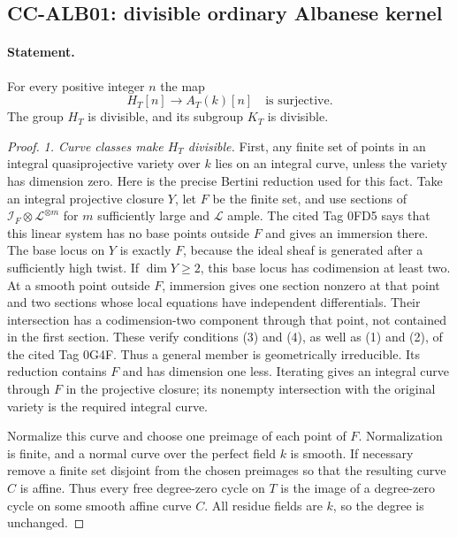 \documentclass[11pt,a4paper]{article}
\theoremstyle{definition}\newtheorem{definition}[theorem]{Definition}
\theoremstyle{remark}\newtheorem{remark}[theorem]{Remark}
\begin{document}
\subsection{CC-ALB01: divisible ordinary Albanese kernel}

\paragraph{Statement.}
For every positive integer $n$ the map
\[
 H_T[n]\longrightarrow A_T(k)[n]
 \quad\text{is surjective}.                         \tag{CC.ALB.1}
\]
The group $H_T$ is divisible, and its subgroup $K_T$ is
divisible.

\begin{proof}
\emph{1. Curve classes make $H_T$ divisible.}
First, any finite set of points in an integral
quasiprojective variety over $k$ lies on an integral
curve, unless the variety has dimension zero.
Here is the precise Bertini reduction used for this fact.
Take an integral projective closure $Y$, let $F$ be the
finite set, and use sections of
$\mathcal I_F\otimes\mathcal L^{\otimes m}$ for $m$
sufficiently large and $\mathcal L$ ample.
The cited Tag 0FD5 says that this linear system has no
base points outside $F$ and gives an immersion there.
The base locus on $Y$ is exactly $F$, because the ideal
sheaf is generated after a sufficiently high twist.
If $\dim Y\geq2$, this base locus has codimension at least
two.  At a smooth point outside $F$, immersion gives one
section nonzero at that point and two sections whose
local equations have independent differentials.
Their intersection has a codimension-two component
through that point, not contained in the first section.
These verify conditions (3) and (4), as well as (1) and
(2), of the cited Tag 0G4F.  Thus a general member is
geometrically irreducible.  Its reduction contains $F$
and has dimension one less.  Iterating gives an
integral curve through $F$ in the projective closure;
its nonempty intersection with the original variety
is the required integral curve.

Normalize this curve and choose one preimage of each
point of $F$.  Normalization is finite, and a normal
curve over the perfect field $k$ is smooth.  If necessary
remove a finite set disjoint from the chosen preimages
so that the resulting curve $C$ is affine.  Thus every
free degree-zero cycle on $T$ is the image of a
degree-zero cycle on some smooth affine curve $C$.
All residue fields are $k$, so the degree is unchanged.


\end{proof}
\end{document}
